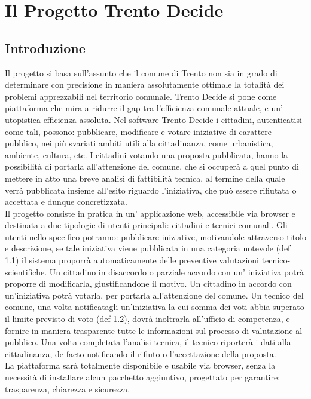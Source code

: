 \chapter{Il Progetto Trento Decide}

\section{Introduzione}

Il progetto si basa sull'assunto che il comune di Trento non sia in grado di 
determinare con precisione in maniera assolutamente ottimale la totalità dei 
problemi apprezzabili nel territorio comunale. Trento Decide si pone come 
piattaforma che mira a ridurre il gap tra l'efficienza comunale attuale, e un' 
utopistica efficienza assoluta. Nel software Trento Decide i cittadini, 
autenticatisi come tali, possono: pubblicare, modificare e votare iniziative di 
carattere pubblico, nei più svariati ambiti utili alla cittadinanza, come 
urbanistica, ambiente, cultura, etc.
I cittadini votando una proposta pubblicata, hanno la possibilità di portarla 
all'attenzione del comune, che si occuperà a quel punto di mettere in atto una 
breve analisi di fattibilità tecnica, al termine della quale verrà pubblicata 
insieme all'esito riguardo l'iniziativa, che può essere rifiutata o accettata e 
dunque concretizzata. \\
Il progetto consiste in pratica in un' applicazione web, accessibile via browser
e destinata a due tipologie di utenti principali: cittadini e tecnici comunali.
Gli utenti nello specifico potranno: pubblicare iniziative, motivandole attraverso 
titolo e descrizione, se tale iniziativa viene pubblicata in una categoria 
notevole (def 1.1) il sistema proporrà automaticamente delle preventive 
valutazioni tecnico-scientifiche. Un cittadino in disaccordo o parziale accordo 
con un' iniziativa potrà proporre di modificarla, giustificandone il motivo. Un 
cittadino in accordo con un'iniziativa potrà votarla, per portarla all'attenzione 
del comune. Un tecnico del comune, una volta notificatagli un'iniziativa la cui 
somma dei voti abbia superato il limite previsto di voto (def 1.2), dovrà 
inoltrarla all'ufficio di competenza, e fornire in maniera trasparente tutte le 
informazioni sul processo di valutazione al pubblico. Una volta completata 
l'analisi tecnica, il tecnico riporterà i dati alla cittadinanza, de facto 
notificando il rifiuto o l'accettazione della proposta. \\
La piattaforma sarà totalmente disponibile e usabile via browser, senza la 
necessità di installare alcun pacchetto aggiuntivo, progettato per garantire: 
trasparenza, chiarezza e sicurezza.

